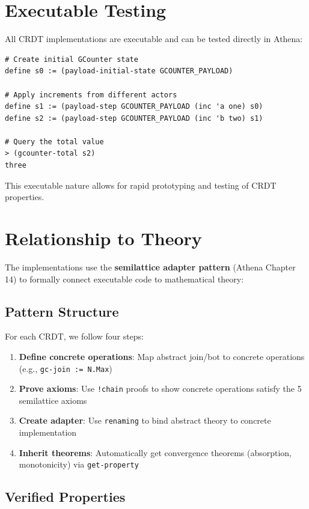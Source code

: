 \section{Executable Testing}

All CRDT implementations are executable and can be tested directly in Athena:

\begin{lstlisting}[language=Athena,style=athena]
# Create initial GCounter state
define s0 := (payload-initial-state GCOUNTER_PAYLOAD)

# Apply increments from different actors
define s1 := (payload-step GCOUNTER_PAYLOAD (inc 'a one) s0)
define s2 := (payload-step GCOUNTER_PAYLOAD (inc 'b two) s1)

# Query the total value
> (gcounter-total s2)
three
\end{lstlisting}

This executable nature allows for rapid prototyping and testing of CRDT properties.

\section{Relationship to Theory}

The implementations use the \textbf{semilattice adapter pattern} (Athena Chapter 14) to formally connect executable code to mathematical theory:

\subsection{Pattern Structure}

For each CRDT, we follow four steps:

\begin{enumerate}
  \item \textbf{Define concrete operations}: Map abstract join/bot to concrete operations (e.g., \texttt{gc-join := N.Max})
  \item \textbf{Prove axioms}: Use \texttt{!chain} proofs to show concrete operations satisfy the 5 semilattice axioms
  \item \textbf{Create adapter}: Use \texttt{renaming} to bind abstract theory to concrete implementation
  \item \textbf{Inherit theorems}: Automatically get convergence theorems (absorption, monotonicity) via \texttt{get-property}
\end{enumerate}

\subsection{Verified Properties}

